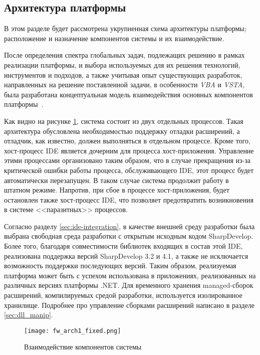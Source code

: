 \subsection{Архитектура платформы}
\label{sec:fw_arch}

В этом разделе будет рассмотрена укрупненная схема архитектуры платформы; расположение и назначение компонентов системы и их взаимодействие.

После определения спектра глобальных задач, подлежащих решению в рамках реализации платформы, и выбора используемых для их решения технологий, инструментов и подходов, а также учитывая опыт существующих разработок, направленных на решение поставленной задачи, в особенности {\it VBA} и {\it VSTA}, была разработана концептуальная модель взаимодействия основных компонентов платформы~\cite{patterns-of-enterprise-app}.

Как видно на рисунке \ref{fw_arch1}, система состоит из двух отдельных процессов. Такая архитектура обусловлена необходимостью поддержку отладки расширений, а отладчик, как известно, должен выполняться в отдельном процессе. Кроме того, хост-процесс IDE является дочерним для процесса хост-приложения. Управление этими процессами организовано таким образом, что в случае прекращения из-за критической ошибки работы процесса, обслуживающего IDE, этот процесс будет автоматически перезапущен. В таком случае система продолжит работу в штатном режиме. Напротив, при сбое в процессе хост-приложения, будет остановлен также хост-процесс IDE, что позволяет предотвратить возникновения в системе <<паразитных>> процессов.

Согласно разделу \ref{sec:ide-integration}, в качестве внешней среду разработки была выбрана свободная среда разработки с открытым исходным кодом SharpDevelop. Более того, благодаря совместимости библиотек входящих в состав этой IDE, реализована поддержка версий SharpDevelop 3.2 и 4.1, а также не исключается возможность поддержки последующих версий. Таким образом, реализуемая платформа может быть с успехом использована в приложениях, реализованных на различных версиях платформы .NET. Для временного хранения managed-сборок расширений, компилируемых средой разработки, используется изолированное хранилище. Подробнее про управление сборками расширений написано в разделе \ref{sec:dll_manip}.

\begin{figure}[!h]
    \centering
    \texttt{[image: fw\_arch1\_fixed.png]}
    \caption{Взаимодействие компонентов системы}
    \label{fw_arch1}
\end{figure}

